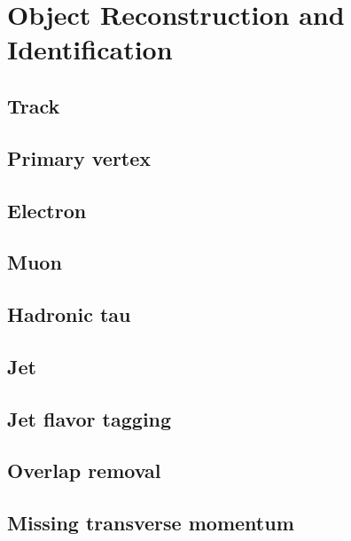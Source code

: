 \chapter{Object Reconstruction and Identification}
\label{chapter:object_reconstruction}

\section{Track}
\section{Primary vertex}
\section{Electron}
\section{Muon}
\section{Hadronic tau}
\section{Jet}
\section{Jet flavor tagging}
\section{Overlap removal}
\section{Missing transverse momentum}